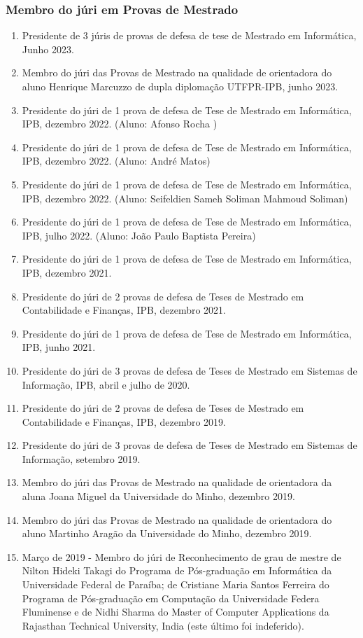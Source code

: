 \documentclass[11pt]{article}
\begin{document}
\subsubsection{Membro do júri em Provas de Mestrado}
\begin{enumerate}
\item{Presidente de 3 júris de provas de defesa de tese de Mestrado em Informática, Junho 2023. }
\item{Membro do júri das Provas de Mestrado na qualidade de orientadora do aluno Henrique Marcuzzo de dupla diplomação UTFPR-IPB, junho 2023.}
\item{Presidente do júri de 1 prova de defesa de Tese de Mestrado em Informática, IPB, dezembro 2022. (Aluno: Afonso Rocha ) }
\item{Presidente do júri de 1 prova de defesa de Tese de Mestrado em Informática, IPB, dezembro 2022. (Aluno: André Matos) }
\item{Presidente do júri de 1 prova de defesa de Tese de Mestrado em Informática, IPB, dezembro 2022. (Aluno: Seifeldien Sameh Soliman Mahmoud Soliman) }
\item{Presidente do júri de 1 prova de defesa de Tese de Mestrado em Informática, IPB, julho 2022. (Aluno: João Paulo Baptista Pereira)}
\item{Presidente do júri de 1 prova de defesa de Tese de Mestrado em Informática, IPB, dezembro 2021.}
\item{Presidente do júri de 2 provas de defesa de Teses de Mestrado em Contabilidade e Finanças, IPB, dezembro 2021.}
\item{Presidente do júri de 1 prova de defesa de Tese de Mestrado em Informática, IPB, junho 2021.}
\item{Presidente do júri de 3 provas de defesa de Teses de Mestrado em Sistemas de Informação, IPB, abril e julho de 2020.}
\item{Presidente do júri de 2 provas de defesa de Teses de Mestrado em Contabilidade e Finanças, IPB, dezembro 2019.}
\item{Presidente do júri de 3 provas de defesa de Teses de Mestrado em Sistemas de Informação, setembro 2019.}
\item{Membro do júri das Provas de Mestrado na qualidade de orientadora da aluna Joana Miguel da Universidade do Minho, dezembro 2019.}
\item{Membro do júri das Provas de Mestrado na qualidade de orientadora do aluno Martinho Aragão da Universidade do Minho, dezembro 2019.}
\item{Março de 2019 - Membro do júri de Reconhecimento de grau de mestre de Nilton Hideki Takagi do Programa de Pós-graduação em Informática da Universidade Federal de Paraíba; de Cristiane Maria Santos Ferreira do Programa de Pós-graduação em Computação da Universidade Federa Fluminense e de Nidhi Sharma do Master of Computer Applications da Rajasthan Technical University, India (este último foi indeferido).}

\end{enumerate}
\end{document}
